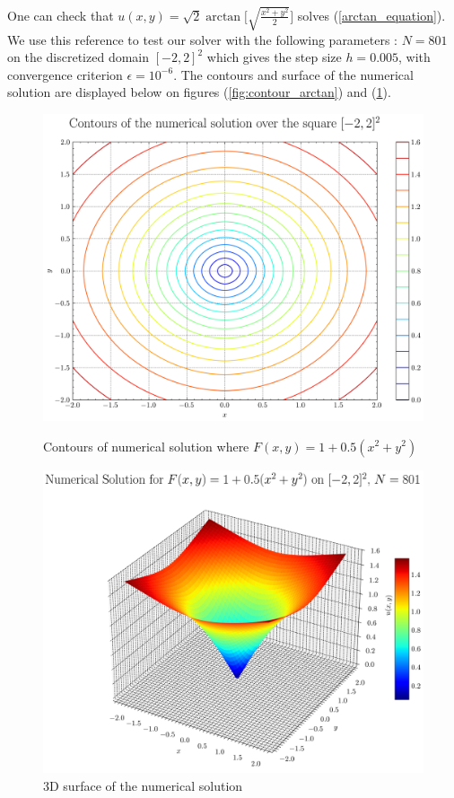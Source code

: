 \documentclass[11pt]{article}
\theoremstyle{definition}
\theoremstyle{remark}
\begin{document}
\noindent One can check that $u(x,y)=\sqrt{2}\arctan\Big[\sqrt{\frac{x^2+y^2}{2}}\Big]$ solves (\ref{arctan_equation}). We use this reference to test our solver with the following parameters : $N=801$ on the discretized domain $[-2,2]^2$ which gives the step size $h=0.005$, with convergence criterion $\epsilon=10^{-6}$. The contours and surface of the numerical solution are displayed below on figures (\ref{fig:contour_arctan}) and (\ref{fig:surface_arctan}). \\

\begin{figure}[h]
  \centering
  \begin{minipage}{0.45\textwidth}
    \centering
    \includegraphics[width=\linewidth]{plots/contour_plot_arctan.png}
    \caption{Contours of numerical solution where $F(x,y)=1+0.5(x^2+y^2)$}
    \label{fig:contour_arctan}
  \end{minipage}
  \hfill
  \begin{minipage}{0.45\textwidth}
    \centering
    \includegraphics[width=\linewidth]{plots/solution_3d_surface_arctan.png}
    \caption{3D surface of the numerical solution}
    \label{fig:surface_arctan}
  \end{minipage}
\end{figure}
\end{document}

